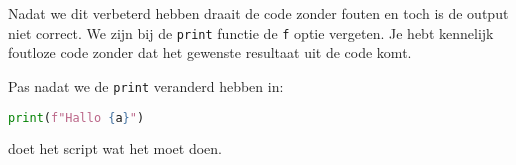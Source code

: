 Nadat we dit verbeterd hebben draait de code zonder fouten en toch is de output niet correct. We zijn bij de \texttt{print} functie de \texttt{f} optie vergeten. Je hebt kennelijk foutloze code zonder dat het gewenste resultaat uit de code komt.

Pas nadat we de \texttt{print} veranderd hebben in:
\begin{lstlisting}[language=python]
   print(f"Hallo {a}")
\end{lstlisting}
doet het script wat het moet doen.


